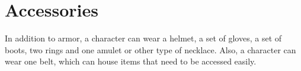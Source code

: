 \chapter{Accessories}\label{ch:accessories}
In addition to armor, a character can wear a helmet, a set of gloves, a set of boots, two rings and one amulet or other type of necklace.
Also, a character can wear one belt, which can house items that need to be accessed easily.\\











